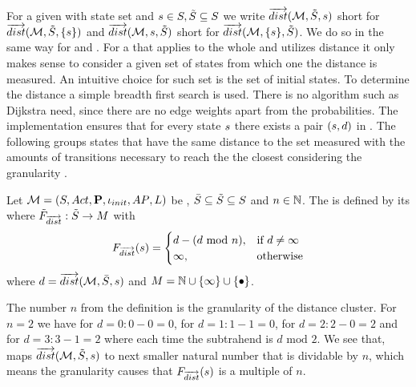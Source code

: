 \documentclass[preview]{standalone}
\begin{document}
For a given \chgphN \chgph with state set \states and ${s} \in {S}, {\tilde{{S}}} \subseteq {S}$ we write ${\overrightarrow{dist}}({{\mathcal{M}}}, {\tilde{{S}}}, {s})$ short for ${\overrightarrow{dist}}({{\mathcal{M}}}, {\tilde{{S}}}, \{{s}\})$ and ${\overrightarrow{dist}}({{\mathcal{M}}}, {s}, {\tilde{{S}}})$ short for ${\overrightarrow{dist}}({{\mathcal{M}}}, \{{s}\}, {\tilde{{S}}})$. We do so in the same way for \distpathbi and \distpathrev.
For a \viewN that applies to the whole and utilizes distance it only makes sense to consider a given set of states from which one the distance is measured. An intuitive choice for such set is the set of initial states. To determine the distance a simple breadth first search is used. There is no algorithm such as Dijkstra need, since there are no edge weights apart from the probabilities. 
The implementation ensures that for every state ${s}$ there exists a pair $({s}, {d})$ in \fctdistdefault. The following \viewN groups states that have the same distance to the set measured with the amounts of transitions necessary to reach the the closest \smstates considering the granularity \grandist.

\begin{definition}
		Let ${{{\mathcal{M}}}} = {{({S}, {Act}, {\textbf{P}}, {\iota_{init}}, {AP}, {L})}}$ be \achgphN, $\bar{{S}} \subseteq {\tilde{\ensuremath{{S}}}} \subseteq {S}$ and $n \in {\mathbb{N}}$. The \viewN \viewdistance is defined by its \grpfctN \gfctdistance where ${{\tilde{F}_{{{\overrightarrow{dist}}}}}} : {\tilde{{S}}} \to {\ensuremath{{M}}}$ with 
		\[
		{{F_{{{\overrightarrow{dist}}}}}}({s}) =
		\begin{cases}
			 {d} - ({d} \text{ mod } n), &\text{if } d \neq \infty \\
			 \infty, &\text{otherwise}
		\end{cases}		
		\]
		where ${d} = {\overrightarrow{dist}}({{{\mathcal{M}}}},\bar{{S}}, {s})$ and $\imggrp = \natnums \cup \{\infty\} \cup \remset$.
\end{definition}

The number $n$ from the definition is the granularity of the distance cluster. For $n = 2$ we have for $d = 0 : 0 - 0 = 0$, for $d = 1 : 1 - 1 = 0$, for $d = 2 : 2 - 0 = 2$ and for $d = 3 : 3 - 1 = 2$ where each time the subtrahend is $d \text{ mod } 2$. We see that, \gfctdistance maps ${\overrightarrow{dist}}({{{\mathcal{M}}}},{\tilde{{S}}}, {s})$ to next smaller natural number that is dividable by $n$, which means the granularity causes that ${{F_{{{\overrightarrow{dist}}}}}}({s})$ is a multiple of $n$.
\end{document}
